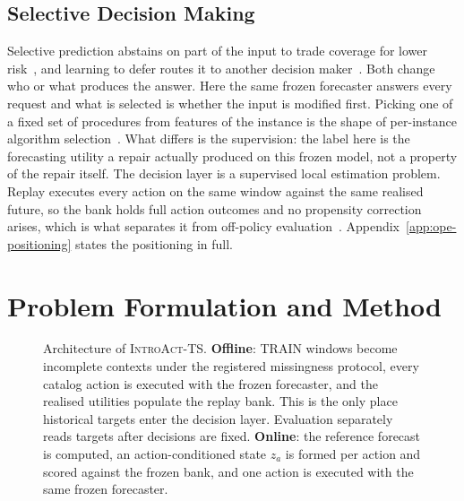 \documentclass{article}
\newcommand{\figph}[3]{%
  \fbox{\parbox[c][#2][c]{#1}{\centering
    \textcolor{phgray}{\textsf{[\detokenize{#3}]}}}}}
\newcommand{\introact}{\textsc{IntroAct-TS}}
\begin{document}
\subsection{Selective Decision Making}
\label{sec:related-selective}
Selective prediction abstains on part of the input to trade coverage for lower
risk~\citep{chow1970optimum,vovk2005algorithmic,geifman2017selective,lei2018distribution}, and
learning to defer routes it to another decision maker~\citep{madras2018predict,
mozannar2020consistent}. Both change who or what produces the answer. Here the same frozen
forecaster answers every request and what is selected is whether the input is modified first.
Picking one of a fixed set of procedures from features of the instance is the shape of
per-instance algorithm selection~\citep{rice1976algorithm,xu2008satzilla}. What differs is the
supervision: the label here is the forecasting utility a repair actually produced on this
frozen model, not a property of the repair itself.
The decision layer is a supervised local estimation problem. Replay executes every action on
the same window against the same realised future, so the bank holds full action outcomes and no
propensity correction arises, which is what separates it from off-policy
evaluation~\citep{dudik2011doubly,swaminathan2015counterfactual}. Appendix~\ref{app:ope-positioning} states the positioning in
full.

\section{Problem Formulation and Method}
\label{sec:method}

\begin{figure}[t]
  \centering
  \figph{0.48\textwidth}{4.6cm}{FIGURE_2_ARCHITECTURE}
  \caption{Architecture of \introact{}. \textbf{Offline}: TRAIN windows become incomplete
  contexts under the registered missingness protocol, every catalog action is executed with the
  frozen forecaster, and the realised utilities populate the replay bank. This is the only place
  historical targets enter the decision layer. Evaluation separately reads targets after
  decisions are fixed. \textbf{Online}: the reference forecast is computed, an action-conditioned
  state $z_a$ is formed per action and scored against the frozen bank, and one action is
  executed with the same frozen forecaster.}
  \label{fig:arch}
\end{figure}
\end{document}
